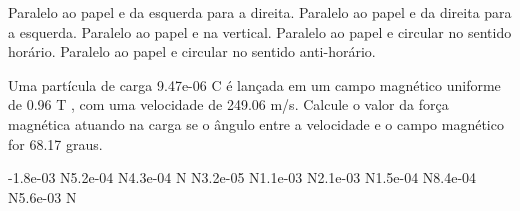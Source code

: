 \documentclass[12pt, addpoints]{exam}
\begin{document}
\begin{questions}
\begin{multicols*}{2}
\begin{choices}
\choice Paralelo ao papel e da esquerda para a direita. 
\choice Paralelo ao papel e da direita para a esquerda. 
\choice Paralelo ao papel e na vertical. 
\choice Paralelo ao papel e circular no sentido horário. 
\choice Paralelo ao papel e circular no sentido anti-horário. 
\end{choices}
\question Uma partícula de carga 9.47e-06 C é lançada em um campo magnético uniforme de    0.96 T , com uma velocidade de 249.06 m/s. Calcule o valor da força magnética atuando na carga se o ângulo entre a velocidade e o campo magnético for   68.17 graus.

\begin{oneparchoices}
\choice -1.8e-03 N\choice 5.2e-04 N\choice 4.3e-04 N N\choice 3.2e-05 N\choice 1.1e-03 N\choice 2.1e-03 N\choice 1.5e-04 N\choice 8.4e-04 N\choice 5.6e-03 N
\end{oneparchoices}\end{multicols*}
\end{questions}
\newpage
\end{document}
